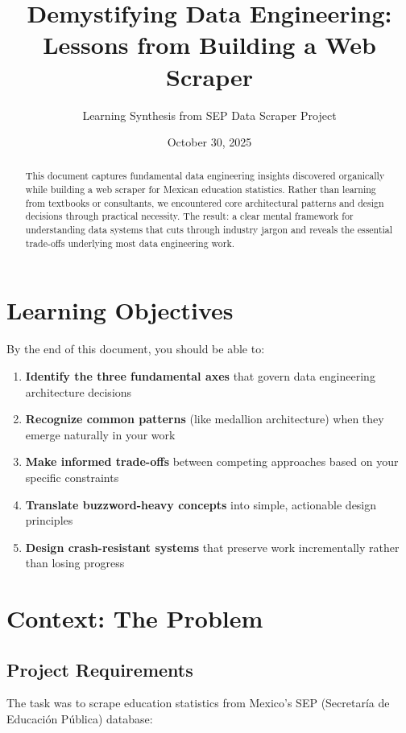 \documentclass[11pt,a4paper]{article}
\title{\textbf{Demystifying Data Engineering:\\Lessons from Building a Web Scraper}}
\author{Learning Synthesis from SEP Data Scraper Project}
\date{October 30, 2025}
\begin{document}
\maketitle

\begin{abstract}
This document captures fundamental data engineering insights discovered organically while building a web scraper for Mexican education statistics. Rather than learning from textbooks or consultants, we encountered core architectural patterns and design decisions through practical necessity. The result: a clear mental framework for understanding data systems that cuts through industry jargon and reveals the essential trade-offs underlying most data engineering work.
\end{abstract}

\section{Learning Objectives}

By the end of this document, you should be able to:

\begin{enumerate}
    \item \textbf{Identify the three fundamental axes} that govern data engineering architecture decisions
    \item \textbf{Recognize common patterns} (like medallion architecture) when they emerge naturally in your work
    \item \textbf{Make informed trade-offs} between competing approaches based on your specific constraints
    \item \textbf{Translate buzzword-heavy concepts} into simple, actionable design principles
    \item \textbf{Design crash-resistant systems} that preserve work incrementally rather than losing progress
\end{enumerate}

\section{Context: The Problem}

\subsection{Project Requirements}

The task was to scrape education statistics from Mexico's SEP (Secretaría de Educación Pública) database:
\end{document}
